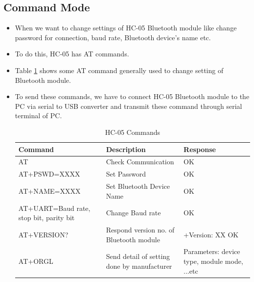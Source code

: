 \documentclass[12pt, a4paper, twoside]{report}
\begin{document}
\subsection{Command Mode}
\begin{itemize}[noitemsep]
\item When we want to change settings of HC-05 Bluetooth module like change password for connection, baud rate, Bluetooth device’s name etc.
\item To do this, HC-05 has AT commands.
\item Table \ref{tab:hc-commands} shows some AT command generally used to change setting of Bluetooth module.
\item To send these commands, we have to connect HC-05 Bluetooth module to the PC via serial to USB converter and transmit these command through serial terminal of PC.
\begin{table}[]
\centering
\begin{tabular}{|p{}|p{}|p{}|}
\hline
\textbf{Command}                        & \textbf{Description}                        & \textbf{Response}                            \\ \hline
AT                                      & Check Communication                         & OK                                           \\ \hline
AT+PSWD=XXXX                            & Set Password                                & OK                                           \\ \hline
AT+NAME=XXXX                            & Set Bluetooth Device Name                   & OK                                           \\ \hline
AT+UART=Baud rate, stop bit, parity bit & Change Baud rate                            & OK                                           \\ \hline
AT+VERSION?                             & Respond version no. of Bluetooth module     & +Version: XX OK                              \\ \hline
AT+ORGL                                 & Send detail of setting done by manufacturer & Parameters: device type, module mode, ...etc \\ \hline
\end{tabular}
\caption{HC-05 Commands}
\label{tab:hc-commands}
\end{table}
\end{itemize}
\end{document}
